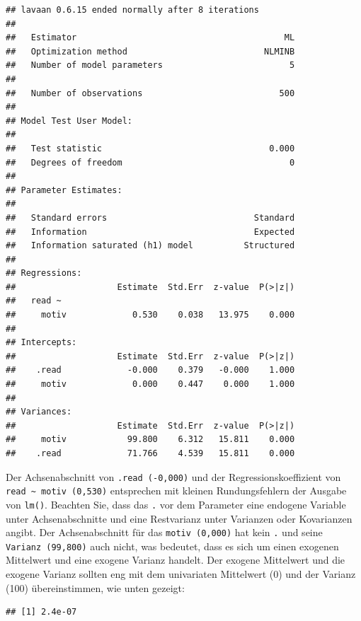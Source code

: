 \documentclass[
]{article}
\newenvironment{Shaded}{\begin{snugshade}}{\end{snugshade}}
\newcommand{\FunctionTok}[1]{\textcolor[rgb]{0.00,0.00,0.00}{#1}}
\newcommand{\NormalTok}[1]{#1}
\newcommand{\SpecialCharTok}[1]{\textcolor[rgb]{0.00,0.00,0.00}{#1}}
\begin{document}
\begin{verbatim}
## lavaan 0.6.15 ended normally after 8 iterations
## 
##   Estimator                                         ML
##   Optimization method                           NLMINB
##   Number of model parameters                         5
## 
##   Number of observations                           500
## 
## Model Test User Model:
##                                                       
##   Test statistic                                 0.000
##   Degrees of freedom                                 0
## 
## Parameter Estimates:
## 
##   Standard errors                             Standard
##   Information                                 Expected
##   Information saturated (h1) model          Structured
## 
## Regressions:
##                    Estimate  Std.Err  z-value  P(>|z|)
##   read ~                                              
##     motiv             0.530    0.038   13.975    0.000
## 
## Intercepts:
##                    Estimate  Std.Err  z-value  P(>|z|)
##    .read             -0.000    0.379   -0.000    1.000
##     motiv             0.000    0.447    0.000    1.000
## 
## Variances:
##                    Estimate  Std.Err  z-value  P(>|z|)
##     motiv            99.800    6.312   15.811    0.000
##    .read             71.766    4.539   15.811    0.000
\end{verbatim}

Der Achsenabschnitt von \texttt{.read\ (-0,000)} und der
Regressionskoeffizient von
\texttt{read\ \textasciitilde{}\ motiv\ (0,530)} entsprechen mit kleinen
Rundungsfehlern der Ausgabe von \texttt{lm()}. Beachten Sie, dass das
\texttt{.} vor dem Parameter eine endogene Variable unter
Achsenabschnitte und eine Restvarianz unter Varianzen oder Kovarianzen
angibt. Der Achsenabschnitt für das \texttt{motiv\ (0,000)} hat kein
\texttt{.} und seine \texttt{Varianz\ (99,800)} auch nicht, was
bedeutet, dass es sich um einen exogenen Mittelwert und eine exogene
Varianz handelt. Der exogene Mittelwert und die exogene Varianz sollten
eng mit dem univariaten Mittelwert (0) und der Varianz (100)
übereinstimmen, wie unten gezeigt:

\begin{Shaded}
\end{Shaded}

\begin{verbatim}
## [1] 2.4e-07
\end{verbatim}
\end{document}
